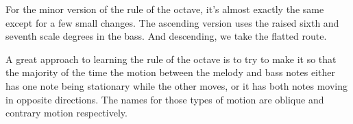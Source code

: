 For the minor version of the rule of the octave, it's almost exactly the same except for a few small changes. The ascending version uses the raised sixth and seventh scale degrees in the bass. And descending, we take the flatted route.


A great approach to learning the rule of the octave is to try to make it so that the majority of the time the motion between the melody and bass notes either has one note being stationary while the other moves, or it has both notes moving in opposite directions. The names for those types of motion are oblique and contrary motion respectively.

